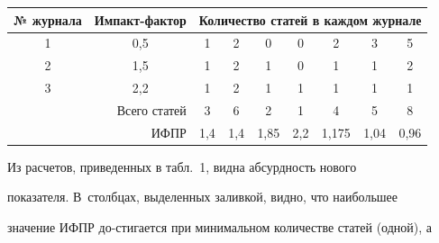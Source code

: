 \begin{table}\small


\begin{center}




\vspace*{2ex}





\begin{tabular}{|c|c|c|c|c|c|c|c|c|}


\hline


№ журнала&Импакт-фактор &\multicolumn{7}{c|}{Количество статей в каждом журнале}\\


\hline


1&0,5&1&2&0&\cellcolor[gray]{.8}0&2&3&\cellcolor[gray]{.8}5\\


2&1,5&1&2&1&\cellcolor[gray]{.8}0&1&1&\cellcolor[gray]{.8}2\\


3&2,2&1&2&1&\cellcolor[gray]{.8}1&1&1&\cellcolor[gray]{.8}1\\


\hline


\multicolumn{2}{|r|}{Всего статей }&3&6&2&\cellcolor[gray]{.8}1&4&5&\cellcolor[gray]{.8}8\\


\hline


\multicolumn{2}{|r|}{ИФПР}&1,4&1,4&1,85&\cellcolor[gray]{.8}2,2&1,175&1,04&\cellcolor[gray]{.8}0,96\\


\hline


\end{tabular}


\end{center}


\vspace*{6pt}


\end{table}





    Из расчетов, приведенных в табл.~1, видна абсурдность нового 


показателя. В~столбцах, выделенных заливкой, видно, что наибольшее 


значение ИФПР до-\linebreak стигается при минимальном количестве статей (одной), а 


